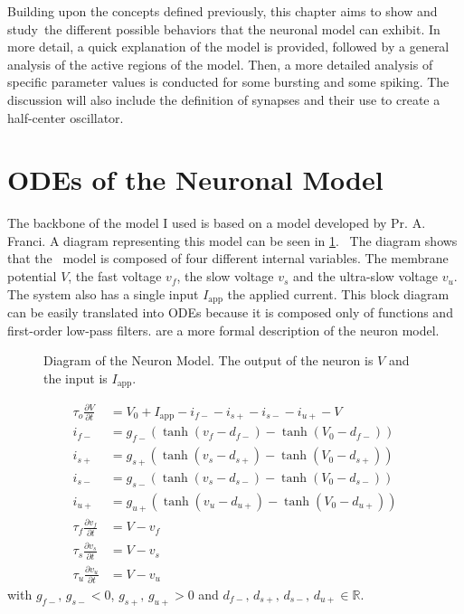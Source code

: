 \label{sec:model}

Building upon the concepts defined previously, this chapter aims to show and study the different possible behaviors that the neuronal model can exhibit.
In more detail, a quick explanation of the model is provided, followed by a general analysis of the active regions of the model. Then, a more detailed analysis of specific parameter values is conducted for some bursting and some spiking.
The discussion will also include the definition of synapses and their use to create a half-center oscillator.

\section{ODEs of the Neuronal Model}

The backbone of the model I used is based on a model developed by Pr. A. Franci.
A diagram representing this model can be seen in \cref{fig:neuron_mod}. 
The diagram shows that the  model is composed of four different internal variables.
The membrane potential $V$, the fast voltage $v_f$, the slow voltage $v_s$ and the ultra-slow voltage $v_u$.
The system also has a single input $I_\text{app}$ the applied current.
This block diagram can be easily translated into ODEs because it is composed only of functions and first-order low-pass filters.
 are a more formal description of the neuron model.

\begin{figure}[!hb]
    \centering
    \caption{Diagram of the Neuron Model. The output of the neuron is $V$ and the input is $I_\text{app}$.}
    \label{fig:neuron_mod}
\end{figure}

\begin{align}
    \tau_o\frac{\partial V}{\partial t} &= V_0 + I_\text{app} - i_{f-} - i_{s+} - i_{s-} - i_{u+} - V\label{eq:neur_start}\\
    i_{f-} &= g_{f-}\left(\tanh\left(v_f-d_{f-}\right) - \tanh\left(V_0-d_{f-}\right)\right)\\ 
    i_{s+} &= g_{s+}\left(\tanh\left(v_s-d_{s+}\right) - \tanh\left(V_0-d_{s+}\right)\right)\\ 
    i_{s-} &= g_{s-}\left(\tanh\left(v_s-d_{s-}\right) - \tanh\left(V_0-d_{s-}\right)\right)\\ 
    i_{u+} &= g_{u+}\left(\tanh\left(v_u-d_{u+}\right) - \tanh\left(V_0-d_{u+}\right)\right)\\ 
    \tau_f\frac{\partial v_f}{\partial t} &= V - v_f\\
    \tau_s\frac{\partial v_s}{\partial t} &= V - v_s\\
    \tau_u\frac{\partial v_u}{\partial t} &= V - v_u\label{eq:neur_end}   
\end{align}
with $g_{f-},\, g_{s-} < 0$, $g_{s+},\, g_{u+} > 0$ and $d_{f-},\, d_{s+},\, d_{s-},\, d_{u+} \in \mathbb{R}$.

